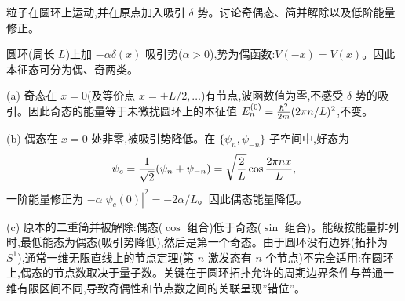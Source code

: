\begin{question}
粒子在圆环上运动,并在原点加入吸引 $\delta$ 势。讨论奇偶态、简并解除以及低阶能量修正。
\end{question}
\begin{solution}
圆环(周长 $L$)上加 $-\alpha\delta(x)$ 吸引势($\alpha>0$),势为偶函数:$V(-x)=V(x)$。因此本征态可分为偶、奇两类。

(a) 奇态在 $x=0$(及等价点 $x=\pm L/2,\dots$)有节点,波函数值为零,不感受 $\delta$ 势的吸引。因此奇态的能量等于未微扰圆环上的本征值 $E_n^{(0)} = {\hbar^2\over2m}(2\pi n/L)^2$,不变。

(b) 偶态在 $x=0$ 处非零,被吸引势降低。在 $\{\psi_n,\psi_{-n}\}$ 子空间中,好态为
\[
\psi_c = {1\over\sqrt2}(\psi_n+\psi_{-n}) = \sqrt{2\over L}\cos{2\pi nx\over L},
\]
一阶能量修正为 $-\alpha|\psi_c(0)|^2 = -2\alpha/L$。因此偶态能量降低。

(c) 原本的二重简并被解除:偶态($\cos$ 组合)低于奇态($\sin$ 组合)。能级按能量排列时,最低能态为偶态(吸引势降低),然后是第一个奇态。由于圆环没有边界(拓扑为 $S^1$),通常一维无限直线上的节点定理(第 $n$ 激发态有 $n$ 个节点)不完全适用:在圆环上,偶态的节点数取决于量子数。关键在于圆环拓扑允许的周期边界条件与普通一维有限区间不同,导致奇偶性和节点数之间的关联呈现”错位”。
\end{solution}

